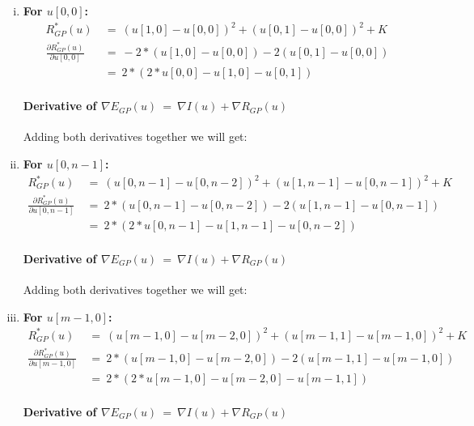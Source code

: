 \documentclass{report}
\begin{document}
					\begin{enumerate}[(i)]
						\item \textbf{For $u[0,0]$:}
						\begin{align*}
							R_{GP}^*(u) \ & = \ (u[1,0] - u[0,0])^2 + (u[0,1] - u[0,0])^2 + K \\
							\frac{\partial R_{GP}^*(u)}{\partial u[0,0]} \ & = \ -2 * (u[1,0] - u[0,0]) - 2 (u[0,1] - u[0,0]) \\
							& = \ 2 * (2 * u[0,0] - u[1,0] - u[0,1])
						\end{align*}
						\vspace{-0.4cm} \paragraph{Derivative of $\nabla E_{GP}(u) \ = \ \nabla I(u) + \nabla R_{GP}(u)$}
						\startsubsection
							Adding both derivatives together we will get:
						\closesection
						\item \textbf{For $u[0,n-1]$:}
						\begin{align*}
							R_{GP}^*(u) \ & = \ (u[0,n-1] - u[0,n-2])^2 + (u[1,n-1] - u[0,n-1])^2 + K \\
							\frac{\partial R_{GP}^*(u)}{\partial u[0,n-1]} \ & = \ 2 * (u[0,n-1] - u[0,n-2]) - 2 (u[1,n-1] - u[0,n-1]) \\
							& = \ 2 * (2 * u[0,n-1] - u[1,n-1] - u[0,n-2])
						\end{align*}
						\vspace{-0.4cm} \paragraph{Derivative of $\nabla E_{GP}(u) \ = \ \nabla I(u) + \nabla R_{GP}(u)$}
						\startsubsection
							Adding both derivatives together we will get:
						\closesection
						\item \textbf{For $u[m-1,0]$:}
						\begin{align*}
							R_{GP}^*(u) \ & = \ (u[m-1,0] - u[m-2,0])^2 + (u[m-1,1] - u[m-1,0])^2 + K \\
							\frac{\partial R_{GP}^*(u)}{\partial u[m-1,0]} \ & = \ 2 * (u[m-1,0] - u[m-2,0]) - 2 (u[m-1,1] - u[m-1,0]) \\
							& = \ 2 * (2 * u[m-1,0] - u[m-2,0] - u[m-1,1])
						\end{align*}
						\vspace{-0.4cm} \paragraph{Derivative of $\nabla E_{GP}(u) \ = \ \nabla I(u) + \nabla R_{GP}(u)$}

\end{enumerate}
\end{document}
